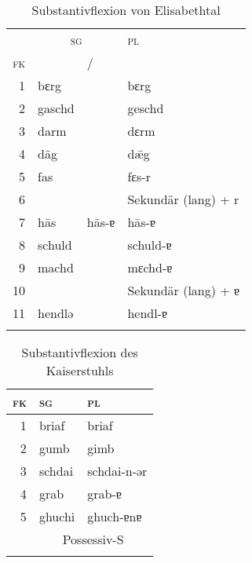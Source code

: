 \begin{table}[H]
	\caption{Substantivflexion von Elisabethtal \citep[50-52]{Žirmunskij1928/29}}\label{table16}
	\begin{tabular}{rlll}
		\lsptoprule
		& \multicolumn{2}{c}{\textsc{sg}} & \textsc{pl}\\\cmidrule(lr){2-3}
		\textsc{fk} & \NOM & \AKK\slash\DAT & \\\midrule
		1 & bɛrg &  & bɛrg\\
		2 & gaschd &  & geschd\\
		3 & darm &  & dɛrm\\
		4 & d\=ag &  & dǣg\\
		5 & fas &  & fɛs-r\\
		6 &  &  & Sekundär (lang) + r\\
		7 & h\=as & h\=as-ɐ & h\=as-ɐ\\
		8 & schuld &  & schuld-ɐ\\
		9 & machd &  & mɛchd-ɐ\\
		10 &  &  & Sekundär (lang) + ɐ\\
		11 & hendlǝ &  & hendl-ɐ\\
		\lspbottomrule
	\end{tabular}
\end{table}


\begin{table}[H]
	\caption{Substantivflexion des Kaiserstuhls \citep[359-373]{Noth1993}}\label{table17}
	\begin{tabular}{rll}
		\lsptoprule
		\textsc{fk} & \textsc{sg} & \textsc{pl}\\\midrule
		1 & briaf & briaf\\
		2 & gumb & gimb\\
		3 & schdai & schdai-n-ər\\
		4 & grab & grab-ɐ\\
		5 & ghuchi & ghuch-ɐnɐ\\
		& \multicolumn{2}{c}{Possessiv-S}\\
		\lspbottomrule
	\end{tabular}
\end{table}



